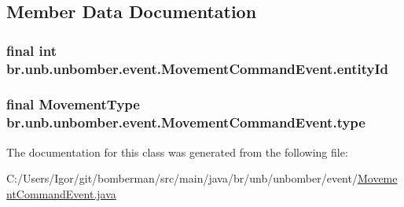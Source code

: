 \subsection{Member Data Documentation}
\hypertarget{classbr_1_1unb_1_1unbomber_1_1event_1_1_movement_command_event_a1d3baa6112e6ec205595de4d5ccb1143}{
\subsubsection[{entity\+Id}]{\setlength{\rightskip}{0pt plus 5cm}final int br.\+unb.\+unbomber.\+event.\+Movement\+Command\+Event.\+entity\+Id\hspace{0.3cm}{\ttfamily [private]}}}\label{classbr_1_1unb_1_1unbomber_1_1event_1_1_movement_command_event_a1d3baa6112e6ec205595de4d5ccb1143}
\hypertarget{classbr_1_1unb_1_1unbomber_1_1event_1_1_movement_command_event_a122cdd825b8fd6e2af29546476c8c2f2}{
\subsubsection[{type}]{\setlength{\rightskip}{0pt plus 5cm}final {\bf Movement\+Type} br.\+unb.\+unbomber.\+event.\+Movement\+Command\+Event.\+type\hspace{0.3cm}{\ttfamily [private]}}}\label{classbr_1_1unb_1_1unbomber_1_1event_1_1_movement_command_event_a122cdd825b8fd6e2af29546476c8c2f2}


The documentation for this class was generated from the following file\+:\begin{DoxyCompactItemize}
\item 
C\+:/\+Users/\+Igor/git/bomberman/src/main/java/br/unb/unbomber/event/\hyperlink{_movement_command_event_8java}{Movement\+Command\+Event.\+java}\end{DoxyCompactItemize}
